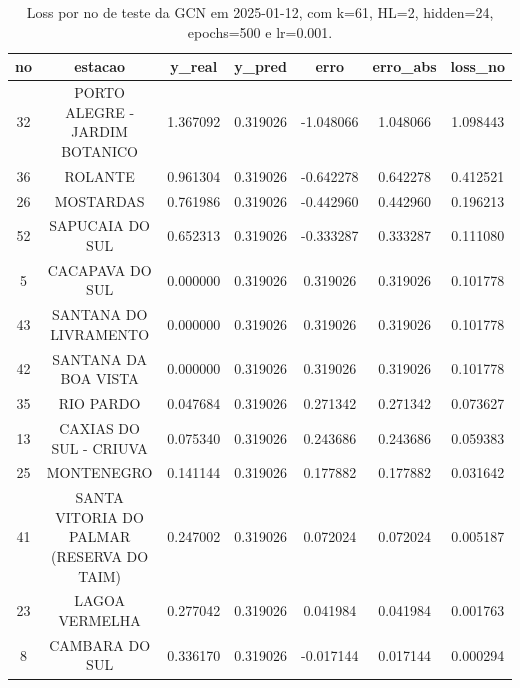 \begin{table}[h]
\centering
\caption{Loss por no de teste da GCN em 2025-01-12, com k=61, HL=2, hidden=24, epochs=500 e lr=0.001.}
\label{tab:gcn_loss_k61_hl2_h24_e500_d20250112}
\begin{tabular}{ccccccc}
\toprule
no & estacao & y\_real & y\_pred & erro & erro\_abs & loss\_no \\
\midrule
32 & PORTO ALEGRE - JARDIM BOTANICO & 1.367092 & 0.319026 & -1.048066 & 1.048066 & 1.098443 \\
36 & ROLANTE & 0.961304 & 0.319026 & -0.642278 & 0.642278 & 0.412521 \\
26 & MOSTARDAS & 0.761986 & 0.319026 & -0.442960 & 0.442960 & 0.196213 \\
52 & SAPUCAIA DO SUL & 0.652313 & 0.319026 & -0.333287 & 0.333287 & 0.111080 \\
5 & CACAPAVA DO SUL & 0.000000 & 0.319026 & 0.319026 & 0.319026 & 0.101778 \\
43 & SANTANA DO LIVRAMENTO & 0.000000 & 0.319026 & 0.319026 & 0.319026 & 0.101778 \\
42 & SANTANA DA BOA VISTA & 0.000000 & 0.319026 & 0.319026 & 0.319026 & 0.101778 \\
35 & RIO PARDO & 0.047684 & 0.319026 & 0.271342 & 0.271342 & 0.073627 \\
13 & CAXIAS DO SUL - CRIUVA & 0.075340 & 0.319026 & 0.243686 & 0.243686 & 0.059383 \\
25 & MONTENEGRO & 0.141144 & 0.319026 & 0.177882 & 0.177882 & 0.031642 \\
41 & SANTA VITORIA DO PALMAR (RESERVA DO TAIM) & 0.247002 & 0.319026 & 0.072024 & 0.072024 & 0.005187 \\
23 & LAGOA VERMELHA & 0.277042 & 0.319026 & 0.041984 & 0.041984 & 0.001763 \\
8 & CAMBARA DO SUL & 0.336170 & 0.319026 & -0.017144 & 0.017144 & 0.000294 \\
\bottomrule
\end{tabular}
\end{table}
